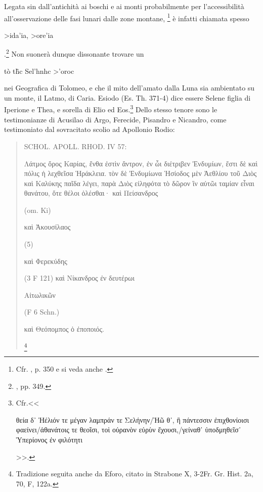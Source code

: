 \documentclass[12pt,a4paper,openright, oneside]{book}
\begin{document}
Legata sin dall'antichità ai boschi e ai monti probabilmente per l'accessibilità all'osservazione delle fasi lunari dalle zone montane, \footnote{Cfr. \cite{Pestalozza}, p. 350 e si veda anche \cite{PestalozzaHec}.} è infatti chiamata spesso \begin{otherlanguage}{greek}>ida'ia, >ore'ia\end{otherlanguage}.\footnote{\cite{Pestalozza}, pp. 349.} Non suonerà dunque dissonante trovare un \begin{otherlanguage}{greek}tò t\~hc Sel'hnhc >'oroc \end{otherlanguage}nei Geografica di Tolomeo, e che il mito dell'amato dalla Luna sia ambientato su un monte, il Latmo, di Caria.
 Esiodo (Es. Th. 371-4) dice essere Selene figlia di Iperione e Thea, e sorella di Elio ed Eos.\footnote{Cfr.<<\begin{otherlanguage}{greek}θεία δ᾽ Ἠέλιόν τε μέγαν λαμπράν τε Σελήνην/Ἠῶ θ᾽, ἣ πάντεσσιν ἐπιχθονίοισι φαείνει/ἀθανάτοις τε θεοῖσι, τοὶ οὐρανὸν εὐρὺν ἔχουσι,/γείναθ᾽ ὑποδμηθεῖσ᾽ Ὑπερίονος ἐν φιλότητι\end{otherlanguage}>>.} Dello stesso tenore sono le testimonianze di Acusilao di Argo, Ferecide, Pisandro e Nicandro, come testimoniato dal sovracitato scolio ad Apollonio Rodio:
\begin{quote}\begin{singlespace}
\footnotesize{
SCHOL. APOLL. RHOD. IV 57: \begin{otherlanguage}{greek} Λάτμος ὄρος Καρίας, ἔνθα
ἐστὶν ἄντρον, ἐν ὧι διέτριβεν Ἐνδυμίων, ἔστι δὲ καὶ πόλις ἡ λεχθεῖσα
Ἡράκλεια. τὸν δὲ Ἐνδυμίωνα Ἡσίοδος  μὲν Ἀεθλίου τοῦ Διὸς καὶ 
Καλύκης παῖδα λέγει, παρὰ Διὸς εἰληφότα τὸ δῶρον ἳν αὐτῶι ταμίαν
εἶναι θανάτου, ὅτε θέλοι ὀλέσθαι· καὶ Πείσανδρος \end{otherlanguage} (om. Ki)\begin{otherlanguage}{greek} καὶ Ἀκουσίλαος\end{otherlanguage}   (5)
\begin{otherlanguage}{greek} καὶ Φερεκύδης \end{otherlanguage} (3 F 121)  καὶ Νίκανδρος ἐν δευτέρωι \begin{otherlanguage}{greek}Αἰτωλικῶν  \end{otherlanguage} (F 6 Schn.) \begin{otherlanguage}{greek} καὶ Θεόπομπος ὁ ἐποποιός.\end{otherlanguage}}
\footnote{Tradizione seguita anche da Eforo, citato in Strabone X, 3-2Fr. Gr. Hist. 2a, 70, F, 122a.}\end{singlespace}\end{quote} 
\end{document}
